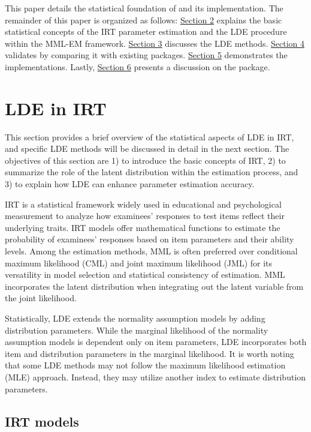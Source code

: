 This paper details the statistical foundation of  and its implementation.
The remainder of this paper is organized as
follows: \protect\hyperlink{lde-in-irt}{Section 2} explains the basic statistical concepts
of the IRT parameter estimation and the LDE procedure within the MML-EM
framework. \protect\hyperlink{lde-methods}{Section 3} discusses the LDE methods.
\protect\hyperlink{package-validation}{Section 4} validates  by comparing it with
existing packages. \protect\hyperlink{implementations-of-the-irtest}{Section 5} demonstrates the
 implementations. Lastly, \protect\hyperlink{discussion}{Section 6} presents
a discussion on the package.

\hypertarget{lde-in-irt}{%
\section{LDE in IRT}\label{lde-in-irt}}

This section provides a brief overview of the statistical aspects of
LDE in IRT, and specific LDE methods will be discussed in detail in the next section.
The objectives of this section are 1) to introduce the basic concepts of IRT, 2)
to summarize the role of the latent distribution within the
estimation process, and 3) to explain how LDE can enhance
parameter estimation accuracy.

IRT is a statistical framework widely used in educational and psychological measurement
to analyze how examinees' responses to test items reflect their underlying traits.
IRT models offer mathematical functions to estimate the probability of examinees'
responses based on item parameters and their ability levels.
Among the estimation methods, MML is often preferred over conditional maximum
likelihood (CML) and joint maximum likelihood (JML) for its versatility in model
selection and statistical consistency of estimation.
MML incorporates the latent distribution when integrating out the latent variable from the joint likelihood.

Statistically, LDE extends the normality assumption models by adding distribution parameters.
While the marginal likelihood of the normality assumption models is dependent
only on item parameters, LDE incorporates both item and distribution parameters
in the marginal likelihood.
It is worth noting that some LDE methods may not follow the maximum
likelihood estimation (MLE) approach. Instead, they may utilize another index to
estimate distribution parameters.

\hypertarget{irt-models}{%
\subsection{IRT models}\label{irt-models}}

